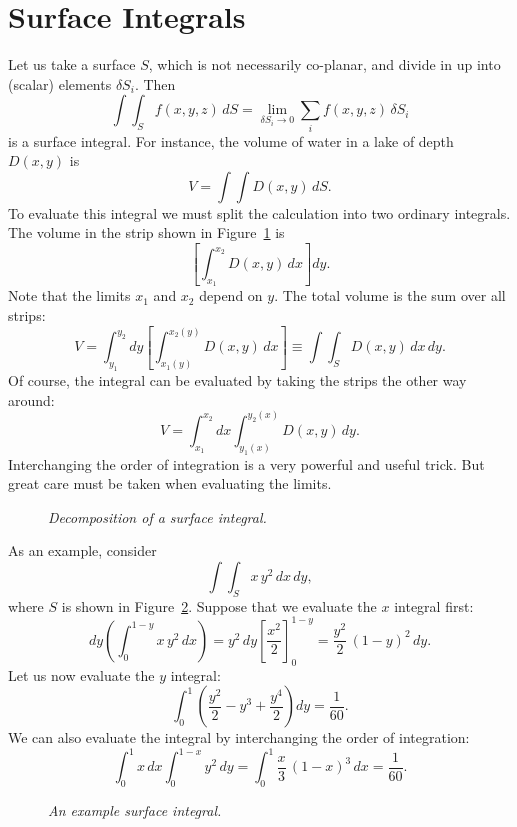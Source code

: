 \section{Surface Integrals}
Let us take a surface $S$, which is not necessarily co-planar, and divide in up
into (scalar) elements $\delta S_i$. Then
\begin{equation}
\int\!\int_S f(x,y,z)\, dS = \lim_{\delta S_i\rightarrow 0}\sum_i f(x,y,z)\,
\delta S_i
\end{equation}
is a surface integral. For instance, the volume of water in a lake of depth
$D(x,y)$ is
\begin{equation}
V= \int\!\int D(x,y)\,dS.
\end{equation}
To evaluate this integral we must split the calculation into two ordinary integrals.
The volume in the strip shown in Figure~\ref{f13} is
\begin{equation}
\left[\int_{x_1}^{x_2} D(x,y)\,dx\right]dy.
\end{equation}
Note that the limits $x_1$ and $x_2$ depend on $y$. The total volume is the sum
over all strips:
\begin{equation}
V = \int_{y_1}^{y_2} dy\left[\int_{x_1(y)}^{x_2(y)} D(x,y)\,dx\right]
\equiv \int\!\int_S D(x,y)\,dx\,dy.
\end{equation} 
Of course, the integral can be evaluated by taking the strips the other way around:
\begin{equation}
V = \int_{x_1}^{x_2} dx \int_{y_1(x)}^{y_2(x)} D(x,y)\,dy.
\end{equation}
Interchanging the order of integration is a very powerful and useful trick. But
great care must be taken when evaluating the limits.
\begin{figure}
\centerline{}
\caption{\em Decomposition of a surface integral.}\label{f13}
\end{figure}

As an example, consider 
\begin{equation}
\int\!\int_S x \,y^2\,dx\,dy,
\end{equation}
where $S$ is shown in Figure~\ref{f14}.
Suppose that we evaluate the $x$ integral  first:
\begin{equation}
dy\left(\int_0^{1-y} x\, y^2\,dx\right) = y^2\,dy\left[ \frac{x^2}{2}\right]^{1-y}_0
= \frac{y^2}{2}\,(1-y)^2\,dy.
\end{equation}
Let us now evaluate the $y$ integral:
\begin{equation}
\int_0^1 \left(\frac{y^2}{2}-y^3+ \frac{y^4}{2}\right)dy = \frac{1}{60}.
\end{equation}
We can also evaluate the integral by interchanging the order of integration:
\begin{equation}
\int_0^1 x\,dx \int_0^{1-x} y^2\,dy = \int_0^1\frac{x}{3}\, (1-x)^3\,dx
 = \frac{1}{60}.
\end{equation}
\begin{figure}
\centerline{}
\caption{\em An example surface integral.}\label{f14}
\end{figure}

